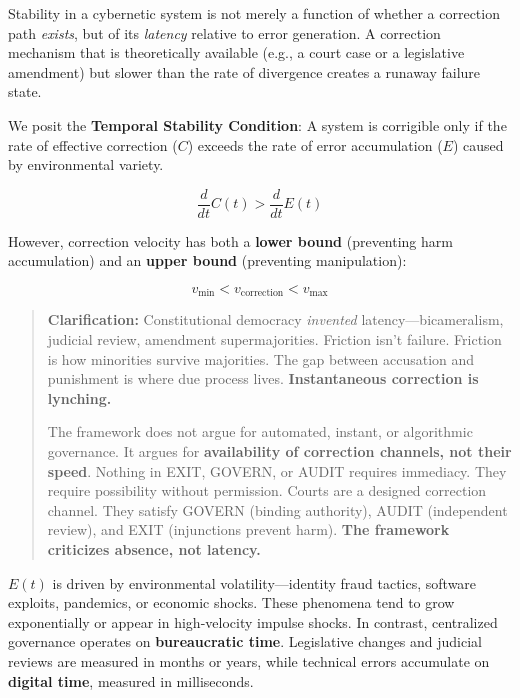 Stability in a cybernetic system is not merely a function of whether a correction path \textit{exists}, but of its \textit{latency} relative to error generation. A correction mechanism that is theoretically available (e.g., a court case or a legislative amendment) but slower than the rate of divergence creates a runaway failure state.

We posit the \textbf{Temporal Stability Condition}: A system is corrigible only if the rate of effective correction ($C$) exceeds the rate of error accumulation ($E$) caused by environmental variety.

\begin{equation}
\frac{d}{dt} C(t) > \frac{d}{dt} E(t)
\label{eq:velocity-lower}
\end{equation}

However, correction velocity has both a \textbf{lower bound} (preventing harm accumulation) and an \textbf{upper bound} (preventing manipulation):

\begin{equation}
v_{\min} < v_{\text{correction}} < v_{\max}
\label{eq:velocity-bounds}
\end{equation}

\begin{quote}
\textbf{Clarification:} Constitutional democracy \textit{invented} latency---bicameralism, judicial review, amendment supermajorities. Friction isn't failure. Friction is how minorities survive majorities. The gap between accusation and punishment is where due process lives. \textbf{Instantaneous correction is lynching.}

The framework does not argue for automated, instant, or algorithmic governance. It argues for \textbf{availability of correction channels, not their speed}. Nothing in EXIT, GOVERN, or AUDIT requires immediacy. They require possibility without permission. Courts are a designed correction channel. They satisfy GOVERN (binding authority), AUDIT (independent review), and EXIT (injunctions prevent harm). \textbf{The framework criticizes absence, not latency.}
\end{quote}

$E(t)$ is driven by environmental volatility---identity fraud tactics, software exploits, pandemics, or economic shocks. These phenomena tend to grow exponentially or appear in high-velocity impulse shocks. In contrast, centralized governance operates on \textbf{bureaucratic time}. Legislative changes and judicial reviews are measured in months or years, while technical errors accumulate on \textbf{digital time}, measured in milliseconds.

